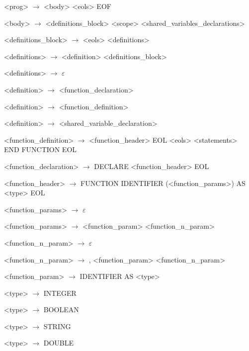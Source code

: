 \begin{normalsize}
    \begin{enumerate}
        {\small
        \item <prog> $\rightarrow$ <body> <eols> EOF
        \item <body> $\rightarrow$ <definitions\_block> <scope> <shared\_variables\_declarations>

        \item <definitions\_block> $\rightarrow$ <eols> <definitions>

        \item <definitions> $\rightarrow$ <definition> <definitions\_block>
        \item <definitions> $\rightarrow$ $\varepsilon$

        \item <definition> $\rightarrow$ <function\_declaration>
        \item <definition> $\rightarrow$ <function\_definition>
        \item <definition> $\rightarrow$ <shared\_variable\_declaration>

        \item <function\_definition> $\rightarrow$ <function\_header> EOL <eols> <statements> END FUNCTION EOL
        \item <function\_declaration> $\rightarrow$ DECLARE <function\_header> EOL

        \item <function\_header> $\rightarrow$ FUNCTION IDENTIFIER (<function\_params>) AS <type> EOL

        \item <function\_params> $\rightarrow$ $\varepsilon$
        \item <function\_params> $\rightarrow$ <function\_param> <function\_n\_param>

        \item <function\_n\_param> $\rightarrow$ $\varepsilon$
        \item <function\_n\_param> $\rightarrow$ , <function\_param> <function\_n\_param>

        \item <function\_param> $\rightarrow$ IDENTIFIER AS <type>


        \item <type> $\rightarrow$ INTEGER
        \item <type> $\rightarrow$ BOOLEAN
        \item <type> $\rightarrow$ STRING
        \item <type> $\rightarrow$ DOUBLE

}
\end{enumerate}
\end{normalsize}
